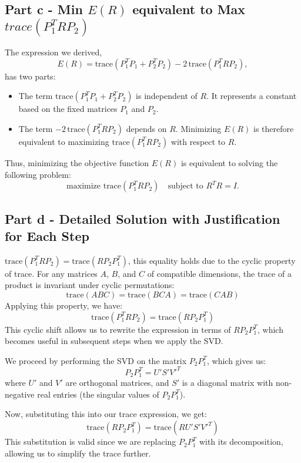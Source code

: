 \documentclass{article}
\begin{document}
\subsection*{Part c - Min \(E(R)\) equivalent to  Max \(trace(P_1^TRP_2)\)}

The expression we derived,
\[
E(R) = \text{trace}(P_1^T P_1 + P_2^T P_2) - 2 \, \text{trace}(P_1^T R P_2),
\]
has two parts:
\begin{itemize}
    \item The term \( \text{trace}(P_1^T P_1 + P_2^T P_2) \) is independent of \( R \). It represents a constant based on the fixed matrices \( P_1 \) and \( P_2 \).
    \item The term \( -2 \, \text{trace}(P_1^T R P_2) \) depends on \( R \). Minimizing \( E(R) \) is therefore equivalent to maximizing \( \text{trace}(P_1^T R P_2) \) with respect to \( R \).
\end{itemize}

Thus, minimizing the objective function \( E(R) \) is equivalent to solving the following problem:
\[
\text{maximize } \text{trace}(P_1^T R P_2) \quad \text{subject to } R^T R = I.
\]

\subsection*{Part d - Detailed Solution with Justification for Each Step}

\( \text{trace}(P_1^T R P_2) = \text{trace}(R P_2 P_1^T) \), this equality holds due to the cyclic property of trace. For any matrices \( A \), \( B \), and \( C \) of compatible dimensions, the trace of a product is invariant under cyclic permutations:
\[
\text{trace}(ABC) = \text{trace}(BCA) = \text{trace}(CAB)
\]
Applying this property, we have:
\[
\text{trace}(P_1^T R P_2) = \text{trace}(R P_2 P_1^T)
\]
This cyclic shift allows us to rewrite the expression in terms of \( R P_2 P_1^T \), which becomes useful in subsequent steps when we apply the SVD.

We proceed by performing the SVD on the matrix \( P_2 P_1^T \), which gives us:
\[
P_2 P_1^T = U' S' V'^T
\]
where \( U' \) and \( V' \) are orthogonal matrices, and \( S' \) is a diagonal matrix with non-negative real entries (the singular values of \( P_2 P_1^T \)).

Now, substituting this into our trace expression, we get:
\[
\text{trace}(R P_2 P_1^T) = \text{trace}(R U' S' V'^T)
\]
This substitution is valid since we are replacing \( P_2 P_1^T \) with its decomposition, allowing us to simplify the trace further.
\end{document}
